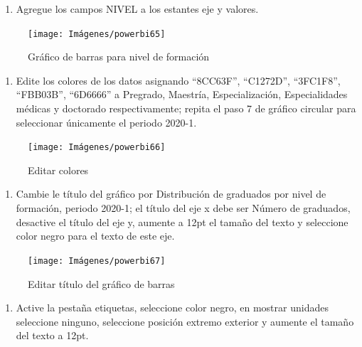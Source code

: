 \documentclass[
]{book}
\providecommand{\tightlist}{%
  \setlength{\itemsep}{0pt}\setlength{\parskip}{0pt}}
\begin{document}
\begin{enumerate}
\def\labelenumi{\arabic{enumi}.}
\setcounter{enumi}{1}
\tightlist
\item
  Agregue los campos NIVEL a los estantes eje y valores.
\end{enumerate}

\begin{figure}

{\centering \texttt{[image: Imágenes/powerbi65]} 

}

\caption{Gráfico de barras para nivel de formación}\label{fig:paso2barras-fig}
\end{figure}

\begin{enumerate}
\def\labelenumi{\arabic{enumi}.}
\setcounter{enumi}{2}
\tightlist
\item
  Edite los colores de los datos asignando ``8CC63F'', ``C1272D'', ``3FC1F8'', ``FBB03B'', ``6D6666'' a Pregrado, Maestría, Especialización, Especialidades médicas y doctorado respectivamente; repita el paso 7 de gráfico circular para seleccionar únicamente el periodo 2020-1.
\end{enumerate}

\begin{figure}

{\centering \texttt{[image: Imágenes/powerbi66]} 

}

\caption{Editar colores}\label{fig:paso3barras-fig}
\end{figure}

\begin{enumerate}
\def\labelenumi{\arabic{enumi}.}
\setcounter{enumi}{3}
\tightlist
\item
  Cambie le título del gráfico por Distribución de graduados por nivel de formación, periodo 2020-1; el título del eje x debe ser Número de graduados, desactive el título del eje y, aumente a 12pt el tamaño del texto y seleccione color negro para el texto de este eje.
\end{enumerate}

\begin{figure}

{\centering \texttt{[image: Imágenes/powerbi67]} 

}

\caption{Editar título del gráfico de barras}\label{fig:paso4barras-fig}
\end{figure}

\begin{enumerate}
\def\labelenumi{\arabic{enumi}.}
\setcounter{enumi}{4}
\tightlist
\item
  Active la pestaña etiquetas, seleccione color negro, en mostrar unidades seleccione ninguno, seleccione posición extremo exterior y aumente el tamaño del texto a 12pt.
\end{enumerate}
\end{document}
